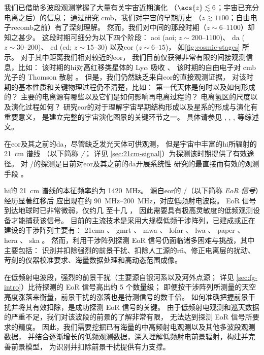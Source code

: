 我们已借助多波段观测掌握了大量有关宇宙近期演化
（$\acs{z} \lesssim 6$；宇宙已充分电离之后）的信息；
通过研究 \ac{cmb}，我们对宇宙的早期历史
（$z \gtrsim 1100$；自由电子\acl{recomb}之前）有了深刻理解。
然而，我们对中间的那段时期（$z \sim \numrange{6}{1100}$）却知之甚少。
这段时期可细分为以下四个阶段\cite{koopmans2015rev}：
\acl{aoi} (\acs{aoi}; $z \sim \numrange{200}{1100}$)、
\acl{da} ($z \sim \numrange{30}{200}$)、
\acl{cd} (\acs{cd}; $z \sim \numrange{15}{30}$)
以及\acl{eor} ($z \sim \numrange{6}{15}$)，
如\autoref{fig:cosmic-stages} 所示。
对于其中距离我们相对较近的\acl{eor}，
我们目前仅获得非常有限的间接观测信息，比如：
该时期的\ac{hi}对高红移类星体的 Ly$\alpha$ 吸收 \cite{becker2001}、
该时期的自由电子对 \ac{cmb} 光子的 Thomson 散射 \cite{kaplinghat2003}。
但是，我们仍然缺乏来自\acl{eor}的直接观测证据，
对该时期的基本性质和关键物理过程仍不清楚，比如：
第一代天体是何时以及如何形成的？
主要的电离源有哪些以及它们是如何影响再电离过程的？
电离氢区的尺度以及演化过程如何？
研究\acl{eor}的对于理解宇宙早期结构形成以及星系的形成与演化有重要意义，
是建立完整的宇宙演化图景的关键环节之一。
具体请参见 \textcite{fan2006rev}, \textcite{morales2010rev},
\textcite{pritchard2012}, \textcite{zaroubi2013rev} 等综述文。

在\acl{eor}及其之前的\acl{da}，尽管缺乏发光天体可供观测，
但是宇宙中丰富的\acl{hi}所辐射的 \SI{21}{\cm} 谱线
（以下简称 \emph{\hisignal/}；
详见 \autoref{sec:21cm-signal}）为探测该时期提供了有效途径。
对 \hisignal/的探测是目前对\acl{eor}及其之前的\acl{da}开展系统性
研究的最直接而有效的观测手段 \cite{koopmans2015rev,furlanetto2016rev}。

\acl{hi}的 \SI{21}{\cm} 谱线的本征频率约为 \SI{1420}{\MHz}。
源自\acl{eor}的 \hisignal/（以下简称 \emph{EoR 信号}）经历显著红移后
应出现在约 \SIrange{90}{200}{\MHz}，对应低频射电波段。
EoR 信号到达地球时已非常微弱，仅约几 \si{\mK} 至十几 \si{\mK}，
因此需要具有极高灵敏度的低频观测设备才能捕获该信号。
目前的主流技术是采用大规模低频干涉阵列，已建成或正在建设的干涉阵列主要有：
\ac{21cma} \cite{zheng2016}、
\ac{gmrt} \cite{paciga2011}、
\ac{mwa} \cite{bowman2013,tingay2013}、
\ac{lofar} \cite{vanHaarlem2013}、
\ac{lwa} \cite{ellingson2009}、
\ac{paper} \cite{parsons2010}、
\ac{hera} \cite{deboer2017}、
\ac{ska} \cite{mellema2013rev,koopmans2015rev}。
然而，利用干涉阵列探测 EoR 信号仍面临诸多困难与挑战，其中主要包括：
识别并扣除强烈的前景干扰、扣除人工源的\ac{rfi}、修正电离层的扰动、
苛刻的仪器校准要求、海量数据处理和高动态范围成像。

在低频射电波段，强烈的前景干扰（主要源自银河系以及河外点源；
详见 \autoref{sec:fg-intro}）比待探测的 EoR 信号高出约 5 个数量级；
即便按干涉阵列所测量的天空亮度涨落来衡量，前景干扰的涨落也是待测信号的数千倍。
如何准确把握前景干扰并将其有效扣除，是成功探测 EoR 信号的关键。
由于低频射电观测和巡天数据的严重不足，我们对该波段的前景的了解非常有限，
无法达到探测 EoR 信号所要求的精度。
因此，我们需要挖掘已有海量的中高频射电观测以及其他多波段观测数据，
并结合逐渐增长的低频观测数据，深入理解低频射电前景辐射，构建并完善前景模型，
为识别并扣除前景干扰提供有力支撑。

